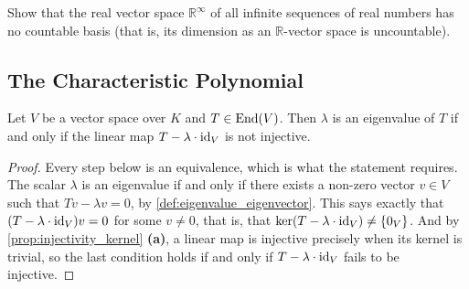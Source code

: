 \begin{exercise}
  \label{exc:uncountable_dimension_sequence_space}
  Show that the real vector space $\mathbb{R}^\infty$ of all infinite sequences of real numbers has no countable basis (that is, its dimension as an $\mathbb{R}$-vector space is uncountable).
\end{exercise}

\subsection{The Characteristic Polynomial}

\begin{proposition}\label{prop:eigen_injective}
  Let $V$ be a vector space over $K$ and $T \in \operatorname{End}(V)$. Then $\lambda$ is an eigenvalue of $T$ if and only if the linear map $T - \lambda \cdot \operatorname{id}_V$ is not injective.
\end{proposition}

\begin{proof}
  Every step below is an equivalence, which is what the statement requires. The scalar $\lambda$ is an eigenvalue if and only if there exists a non-zero vector $v \in V$ such that $Tv - \lambda v = 0$, by \cref{def:eigenvalue_eigenvector}. This says exactly that $(T - \lambda \cdot \operatorname{id}_V)v = 0$ for some $v \ne 0$, that is, that $\ker(T - \lambda \cdot \operatorname{id}_V) \ne \{0_V\}$. And by \cref{prop:injectivity_kernel} \textbf{(a)}, a linear map is injective precisely when its kernel is trivial, so the last condition holds if and only if $T - \lambda \cdot \operatorname{id}_V$ fails to be injective.
\end{proof}

